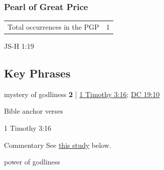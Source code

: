 	\subsubsection{Pearl of Great Price} %
		\label{GODLINESS-PGP}
	
		\begin{tabular}{ll}
			Total occurrences in the PGP & 1
		\end{tabular}
		
		\begin{compactdesc}
			\item[JS-H 1:19]
		\end{compactdesc}
		
\subsection{Key Phrases} %
	\label{GODLINESS-PHRASES}

	\begin{compactdesc}
	
		\item[mystery of godliness] \textbf{2} | \hyperref[1TIMOTHY-3-16]{1 Timothy 3:16}; \hyperref[DC19-10]{DC 19:10}
			\begin{compactdesc}
				\item[Bible anchor verses] \phantom{.}
					\begin{compactdesc}
						\item[1 Timothy 3:16] 
					\end{compactdesc}
				\item[Commentary] See \hyperref[GODLINESS-mystery]{this study} below.
			\end{compactdesc}
			
		\item[power of godliness] 
		
	\end{compactdesc}
	


